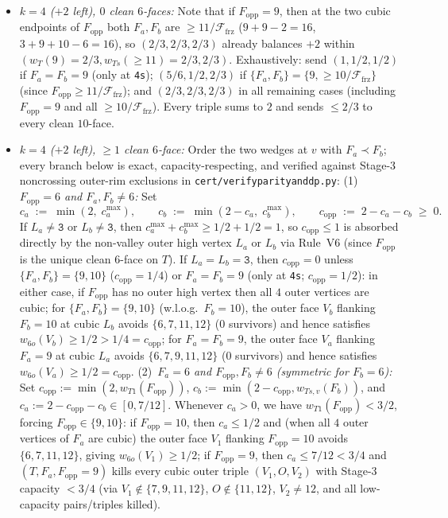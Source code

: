 \documentclass[11pt,reqno]{amsart}
\theoremstyle{plain}
\theoremstyle{definition}
\theoremstyle{remark}
\newcommand{\Ffrz}{\mathcal{F}_{\mathrm{frz}}}
\DeclareRobustCommand{\_}{\ifmmode\text{\textunderscore}\else\textunderscore\allowbreak\fi}
\begin{document}
\begin{itemize}[leftmargin=1.8em]
\begin{enumerate}[label=(\roman*),leftmargin=2.0em]
\begin{itemize}[leftmargin=1.4em]
        \item \emph{$k = 4$ ($+2$ left), $0$ clean $6$-faces:} Note that if $F_{\mathrm{opp}} = 9$, then at the two cubic endpoints of $F_{\mathrm{opp}}$ both $F_a, F_b$ are $\ge 11/\Ffrz$ ($9+9-2=16$, $3+9+10-6=16$), so $(2/3, 2/3, 2/3)$ already balances $+2$ within $(w_T(9) = 2/3, w_{Ts}(\ge 11) = 2/3, 2/3)$. Exhaustively: send $(1, 1/2, 1/2)$ if $F_a = F_b = 9$ (only at \texttt{4s}); $(5/6, 1/2, 2/3)$ if $\{F_a, F_b\} = \{9, \ge 10/\Ffrz\}$ (since $F_{\mathrm{opp}} \ge 11/\Ffrz$); and $(2/3, 2/3, 2/3)$ in all remaining cases (including $F_{\mathrm{opp}} = 9$ and all $\ge 10/\Ffrz$). Every triple sums to $2$ and sends $\le 2/3$ to every clean $10$-face.
        \item \emph{$k = 4$ ($+2$ left), $\ge 1$ clean $6$-face:} Order the two wedges at $v$ with $F_a \prec F_b$; every branch below is exact, capacity-respecting, and verified against Stage-3 noncrossing outer-rim exclusions in \texttt{cert/verify\_parity\_and\_dp.py}:
          (1)~\emph{$F_{\mathrm{opp}} = 6$ and $F_a, F_b \neq 6$:} Set
          \[
            c_a \;:=\; \min(2,\; c_a^{\max}), \qquad c_b \;:=\; \min(2 - c_a,\; c_b^{\max}), \qquad c_{\mathrm{opp}} \;:=\; 2 - c_a - c_b \;\ge\; 0.
          \]
          If $L_a \neq \texttt{3}$ or $L_b \neq \texttt{3}$, then $c_a^{\max} + c_b^{\max} \ge 1/2 + 1/2 = 1$, so $c_{\mathrm{opp}} \le 1$ is absorbed directly by the non-valley outer high vertex $L_a$ or $L_b$ via Rule~V6 (since $F_{\mathrm{opp}}$ is the unique clean $6$-face on $T$). If $L_a = L_b = \texttt{3}$, then $c_{\mathrm{opp}} = 0$ unless $\{F_a, F_b\} = \{9, 10\}$ ($c_{\mathrm{opp}} = 1/4$) or $F_a = F_b = 9$ (only at \texttt{4s}; $c_{\mathrm{opp}} = 1/2$): in either case, if $F_{\mathrm{opp}}$ has no outer high vertex then all $4$ outer vertices are cubic; for $\{F_a, F_b\} = \{9, 10\}$ (w.l.o.g.\ $F_b = 10$), the outer face $V_b$ flanking $F_b = 10$ at cubic $L_b$ avoids $\{6, 7, 11, 12\}$ ($0$ survivors) and hence satisfies $w_{6o}(V_b) \ge 1/2 > 1/4 = c_{\mathrm{opp}}$; for $F_a = F_b = 9$, the outer face $V_a$ flanking $F_a = 9$ at cubic $L_a$ avoids $\{6, 7, 9, 11, 12\}$ ($0$ survivors) and hence satisfies $w_{6o}(V_a) \ge 1/2 = c_{\mathrm{opp}}$.
          (2)~\emph{$F_a = 6$ and $F_{\mathrm{opp}}, F_b \neq 6$ (symmetric for $F_b = 6$):} Set $c_{\mathrm{opp}} := \min(2, w_{T1}(F_{\mathrm{opp}}))$, $c_b := \min(2 - c_{\mathrm{opp}}, w_{Ts,v}(F_b))$, and $c_a := 2 - c_{\mathrm{opp}} - c_b \in [0, 7/12]$. Whenever $c_a > 0$, we have $w_{T1}(F_{\mathrm{opp}}) < 3/2$, forcing $F_{\mathrm{opp}} \in \{9, 10\}$: if $F_{\mathrm{opp}} = 10$, then $c_a \le 1/2$ and (when all $4$ outer vertices of $F_a$ are cubic) the outer face $V_1$ flanking $F_{\mathrm{opp}} = 10$ avoids $\{6, 7, 11, 12\}$, giving $w_{6o}(V_1) \ge 1/2$; if $F_{\mathrm{opp}} = 9$, then $c_a \le 7/12 < 3/4$ and $(T, F_a, F_{\mathrm{opp}}=9)$ kills every cubic outer triple $(V_1, O, V_2)$ with Stage-3 capacity $< 3/4$ (via $V_1 \notin \{7, 9, 11, 12\}$, $O \notin \{11, 12\}$, $V_2 \neq 12$, and all low-capacity pairs/triples killed).

\end{itemize}
\end{enumerate}
\end{itemize}
\end{document}
